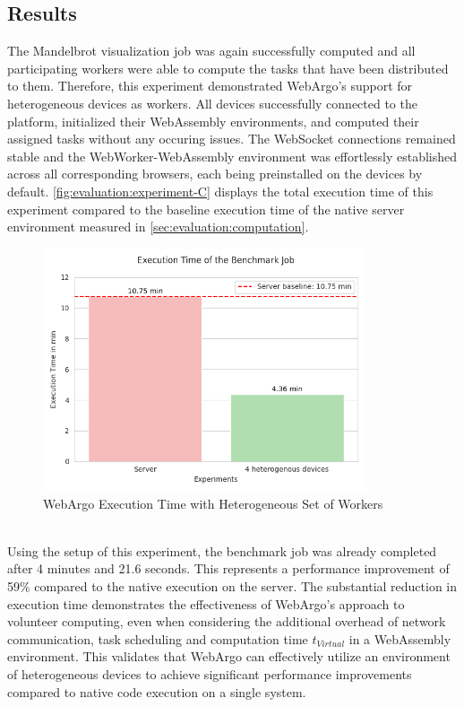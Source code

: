 \subsection{Results}
The Mandelbrot visualization job was again successfully computed and all participating workers were able to compute the tasks that have been distributed to them. Therefore, this experiment demonstrated WebArgo's support for heterogeneous devices as workers. All devices successfully connected to the platform, initialized their WebAssembly environments, and computed their assigned tasks without any occuring issues. The WebSocket connections remained stable and the WebWorker-WebAssembly environment was effortlessly established across all corresponding browsers, each being preinstalled on the devices by default. \autoref{fig:evaluation:experiment-C} displays the total execution time of this experiment compared to the baseline execution time of the native server environment measured in \autoref{sec:evaluation:computation}.
\begin{figure}[htbp]
    \centering
    \includegraphics[width=0.85\textwidth]{gfx/figures/Evaluation_C.png}
    \caption{WebArgo Execution Time with Heterogeneous Set of Workers}
    \label{fig:evaluation:experiment-C}
\end{figure}
~\\
Using the setup of this experiment, the benchmark job was already completed after 4 minutes and 21.6 seconds. This represents a performance improvement of 59\% compared to the native execution on the server. The substantial reduction in execution time demonstrates the effectiveness of WebArgo's approach to volunteer computing, even when considering the additional overhead of network communication, task scheduling and computation time $t_{Virtual}$ in a WebAssembly environment. This validates that WebArgo can effectively utilize an environment of heterogeneous devices to achieve significant performance improvements compared to native code execution on a  single system.

